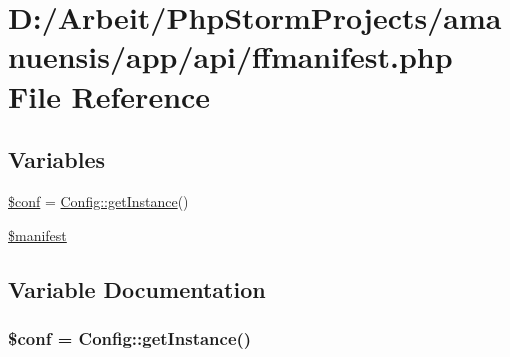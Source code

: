 \hypertarget{a00081}{}\section{D\+:/\+Arbeit/\+Php\+Storm\+Projects/amanuensis/app/api/ffmanifest.php File Reference}
\label{a00081}
\subsection*{Variables}
\begin{DoxyCompactItemize}
\item 
\hyperlink{a00081_ae4901046cc3e1deebf77ccc785384a78}{\$conf} = \hyperlink{a00018_ac93fbec81f07e5d15f80db907e63dc10}{Config\+::get\+Instance}()
\item 
\hyperlink{a00081_a4d1af7792e788060ae7e6f5cf8f28afa}{\$manifest}
\end{DoxyCompactItemize}


\subsection{Variable Documentation}
\hypertarget{a00081_ae4901046cc3e1deebf77ccc785384a78}{}
\subsubsection[{\$conf}]{\setlength{\rightskip}{0pt plus 5cm}\$conf = {\bf Config\+::get\+Instance}()}\label{a00081_ae4901046cc3e1deebf77ccc785384a78}
\hypertarget{a00081_a4d1af7792e788060ae7e6f5cf8f28afa}{}
